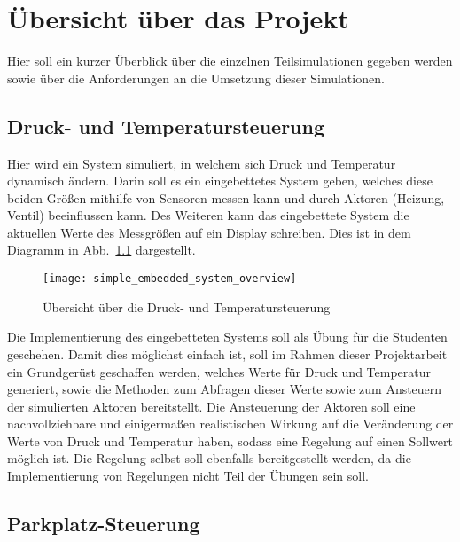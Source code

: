 \documentclass[oneside]{elaboration}
\begin{document}
\chapter{Übersicht über das Projekt}
\label{chp:uebersicht_ueber_das_projekt}

Hier soll ein kurzer Überblick über die einzelnen Teilsimulationen gegeben
werden sowie über die Anforderungen an die Umsetzung dieser Simulationen.

\section{Druck- und Temperatursteuerung}
\label{sec:druck-_und_temperatursteuerung}

Hier wird ein System simuliert, in welchem sich Druck und Temperatur dynamisch
ändern. Darin soll es ein eingebettetes System geben, welches diese beiden
Größen mithilfe von Sensoren messen kann und durch Aktoren (Heizung, Ventil)
beeinflussen kann. Des Weiteren kann das eingebettete System die aktuellen Werte
des Messgrößen auf ein Display schreiben. Dies ist in dem Diagramm in
Abb.~\ref{fig:simple_embedded_system_overview} dargestellt.

\begin{figure}[hbt]
\centering
\texttt{[image: simple\_embedded\_system\_overview]}
\caption{Übersicht über die Druck- und Temperatursteuerung}
\label{fig:simple_embedded_system_overview}
\end{figure}

Die Implementierung des eingebetteten Systems soll als Übung für die Studenten
geschehen. Damit dies möglichst einfach ist, soll im Rahmen dieser Projektarbeit
ein Grundgerüst geschaffen werden, welches Werte für Druck und Temperatur
generiert, sowie die Methoden zum Abfragen dieser Werte sowie zum Ansteuern der
simulierten Aktoren bereitstellt. Die Ansteuerung der Aktoren soll eine
nachvollziehbare und einigermaßen realistischen Wirkung auf die Veränderung der
Werte von Druck und Temperatur haben, sodass eine Regelung auf einen Sollwert
möglich ist. Die Regelung selbst soll ebenfalls bereitgestellt werden, da die
Implementierung von Regelungen nicht Teil der Übungen sein soll.

\section{Parkplatz-Steuerung}
\label{sec:parkplatz-steuerung}
\end{document}
